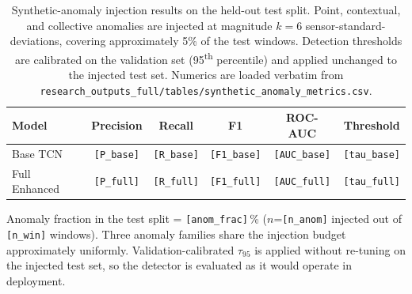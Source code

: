\begin{table}[H]
\centering
\caption{Synthetic-anomaly injection results on the held-out test split. Point, contextual, and collective anomalies are injected at magnitude $k=6$ sensor-standard-deviations, covering approximately 5\% of the test windows. Detection thresholds are calibrated on the validation set (95\textsuperscript{th} percentile) and applied unchanged to the injected test set. Numerics are loaded verbatim from \texttt{research\_outputs\_full/tables/synthetic\_anomaly\_metrics.csv}.}
\label{table:synthetic_injection}
\small
\renewcommand{\arraystretch}{1.1}
\begin{tabular}{lccccc}
\toprule
\textbf{Model} & \textbf{Precision} & \textbf{Recall} & \textbf{F1} & \textbf{ROC-AUC} & \textbf{Threshold} \\
\midrule
Base TCN          & \texttt{[P\_base]}  & \texttt{[R\_base]}  & \texttt{[F1\_base]}  & \texttt{[AUC\_base]}  & \texttt{[tau\_base]} \\
Full Enhanced     & \texttt{[P\_full]}  & \texttt{[R\_full]}  & \texttt{[F1\_full]}  & \texttt{[AUC\_full]}  & \texttt{[tau\_full]} \\
\bottomrule
\end{tabular}
\begin{flushleft}
\footnotesize Anomaly fraction in the test split = \texttt{[anom\_frac]}\,\% ($n$=\texttt{[n\_anom]} injected out of \texttt{[n\_win]} windows). Three anomaly families share the injection budget approximately uniformly. Validation-calibrated $\tau_{95}$ is applied without re-tuning on the injected test set, so the detector is evaluated as it would operate in deployment.
\end{flushleft}
\end{table}

